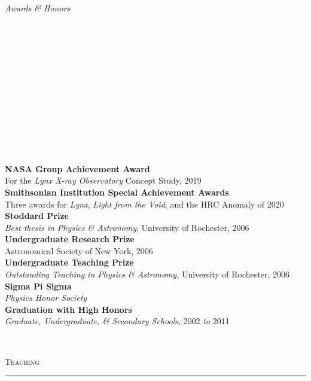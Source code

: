 \documentclass[11pt]{article}
\makeatletter
\def\vhrulefill#1{\leavevmode\leaders\hrule\@height#1\hfill \kern\z@}
\makeatother
\begin{document}
\vspace{4mm}

\hspace{2.5mm} \parbox{1.5in}{\textit{Awards \& Honors \\\\\\\\\\\\\\\\\\\\\\\\\\}} \parbox{5.15in}{
\textbf{NASA Group Achievement Award} \\ For the \textit{Lynx X-ray Observatory} Concept Study, 2019\\
\textbf{Smithsonian Institution Special Achievement Awards} \\ Three awards for \textit{Lynx}, \textit{Light from the Void}, and the HRC Anomaly of 2020\\
\textbf{Stoddard Prize} \\ \textit{Best thesis in Physics \& Astronomy}, University of Rochester, 2006 \\
\textbf{Undergraduate Research Prize} \\ Astronomical Society of New York, 2006 \\
\textbf{Undergraduate Teaching Prize} \\ \textit{Outstanding Teaching in Physics \& Astronomy}, University of Rochester, 2006\\
\textbf{Sigma Pi Sigma} \\ \textit{Physics Honor Society} \\
\textbf{Graduation with High Honors} \\ \textit{Graduate, Undergraduate, \& Secondary Schools}, 2002 \textit{to} 2011
} \\


\vspace{2mm}




\textsc{Teaching} \vhrulefill{0.4pt}

\vspace{6mm}
\end{document}
